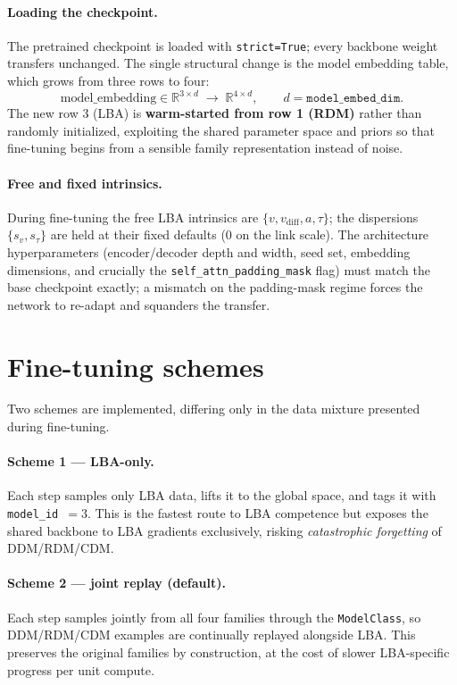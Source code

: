 \documentclass[11pt]{article}
\begin{document}
\paragraph{Loading the checkpoint.}
The pretrained checkpoint is loaded with \texttt{strict=True}; every backbone
weight transfers unchanged. The single structural change is the model embedding
table, which grows from three rows to four:
\[
  \text{model\_embedding} \in \mathbb{R}^{3 \times d}
  \;\longrightarrow\;
  \mathbb{R}^{4 \times d}, \qquad d = \texttt{model\_embed\_dim}.
\]
The new row 3 (LBA) is \textbf{warm-started from row 1 (RDM)} rather than
randomly initialized, exploiting the shared parameter space and priors so that
fine-tuning begins from a sensible family representation instead of noise.

\paragraph{Free and fixed intrinsics.}
During fine-tuning the free LBA intrinsics are $\{v, v_{\mathrm{diff}}, a,
\tau\}$; the dispersions $\{s_v, s_\tau\}$ are held at their fixed defaults
($0$ on the link scale). The architecture hyperparameters (encoder/decoder
depth and width, seed set, embedding dimensions, and crucially the
\texttt{self\_attn\_padding\_mask} flag) must match the base checkpoint exactly;
a mismatch on the padding-mask regime forces the network to re-adapt and
squanders the transfer.

\section{Fine-tuning schemes}

Two schemes are implemented, differing only in the data mixture presented during
fine-tuning.

\paragraph{Scheme 1 --- LBA-only.}
Each step samples only LBA data, lifts it to the global space, and tags it with
\texttt{model\_id}~$=3$. This is the fastest route to LBA competence but exposes
the shared backbone to LBA gradients exclusively, risking \emph{catastrophic
forgetting} of DDM/RDM/CDM.

\paragraph{Scheme 2 --- joint replay (default).}
Each step samples jointly from all four families through the
\texttt{ModelClass}, so DDM/RDM/CDM examples are continually replayed alongside
LBA. This preserves the original families by construction, at the cost of
slower LBA-specific progress per unit compute.
\end{document}
